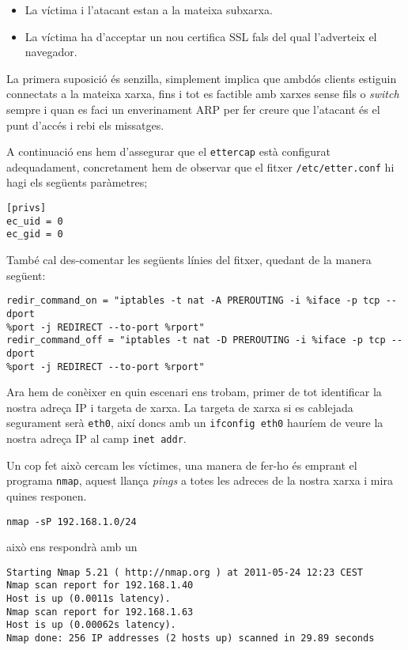 \documentclass[a4paper,11pt]{scrartcl}
\begin{document}
\begin{itemize}
  \item La víctima i l'atacant estan a la mateixa subxarxa.
  \item La víctima ha d'acceptar un nou certifica SSL fals del qual l'adverteix el navegador.
\end{itemize}

La primera suposició és senzilla, simplement implica que ambdós clients estiguin connectats
a la mateixa xarxa, fins i tot es factible amb xarxes sense fils o \emph{switch} sempre
i quan es faci un enverinament ARP per fer creure que l'atacant és el punt d'accés
i rebi els missatges.

A continuació ens hem d'assegurar que el \texttt{ettercap} està configurat adequadament,
concretament hem de observar que el fitxer \texttt{/etc/etter.conf} hi hagi els següents paràmetres;

\begin{verbatim}
[privs]
ec_uid = 0
ec_gid = 0
\end{verbatim}

També cal des-comentar les següents línies del fitxer, quedant de la manera següent:

\begin{verbatim}
redir_command_on = "iptables -t nat -A PREROUTING -i %iface -p tcp --dport
%port -j REDIRECT --to-port %rport"
redir_command_off = "iptables -t nat -D PREROUTING -i %iface -p tcp --dport
%port -j REDIRECT --to-port %rport"
\end{verbatim}

Ara hem de conèixer en quin escenari ens trobam, primer de tot identificar la nostra adreça IP
i targeta de xarxa. La targeta de xarxa si es cablejada segurament serà \texttt{eth0},
així doncs amb un \texttt{ifconfig eth0} hauríem de veure la nostra adreça IP al camp
\texttt{inet addr}.

Un cop fet això cercam les víctimes, una manera de fer-ho és emprant el programa \texttt{nmap},
aquest llança \emph{pings} a totes les adreces de la nostra xarxa i mira quines responen.

\begin{verbatim}
nmap -sP 192.168.1.0/24
\end{verbatim}

això ens respondrà amb un

\begin{verbatim}
Starting Nmap 5.21 ( http://nmap.org ) at 2011-05-24 12:23 CEST
Nmap scan report for 192.168.1.40
Host is up (0.0011s latency).
Nmap scan report for 192.168.1.63
Host is up (0.00062s latency).
Nmap done: 256 IP addresses (2 hosts up) scanned in 29.89 seconds
\end{verbatim}
\end{document}
